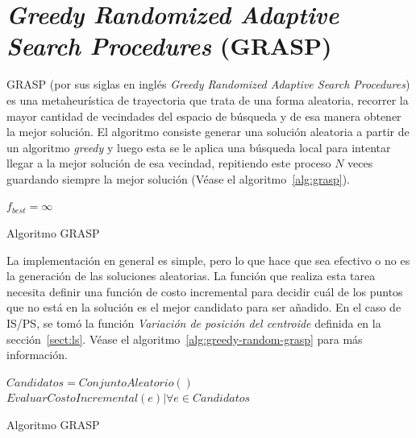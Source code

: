 \documentclass{ci5652}
\begin{document}
\section{\textit{\textbf{Greedy Randomized Adaptive Search Procedures}} (GRASP)}

GRASP (por sus siglas en inglés \textit{Greedy Randomized Adaptive Search Procedures}) es una metaheurística de trayectoria que trata de una forma aleatoria, recorrer la mayor cantidad de vecindades del espacio de búsqueda y de esa manera obtener la mejor solución. El algoritmo consiste generar una solución aleatoria a partir de un algoritmo \textit{greedy} y luego esta se le aplica una búsqueda local para intentar llegar a la mejor solución de esa vecindad, repitiendo este proceso $N$ veces guardando siempre la mejor solución (Véase el algoritmo~\ref{alg:grasp}). 

\begin{algorithm}
 \DontPrintSemicolon
 \vspace*{0.1cm}
 
 $f_{best} = \infty$\;
 \vspace*{0.1cm}
 \caption{Algoritmo GRASP}
 \label{alg:grasp}
\end{algorithm}
La implementación en general es simple, pero lo que hace que sea efectivo o no es la generación de las soluciones aleatorias. La función que realiza esta tarea necesita definir una función de costo incremental para decidir cuál de los puntos que no está en la solución es el mejor candidato para ser añadido. En el caso de IS/PS, se tomó la función \textit{Variación de posición del centroide} definida en la sección~\ref{sect:ls}. Véase el algoritmo~\ref{alg:greedy-random-grasp} para más información.


\begin{algorithm}
 \DontPrintSemicolon
 \vspace*{0.1cm}
 $Candidatos = ConjuntoAleatorio()$\;
 $EvaluarCostoIncremental(e)|\forall e\in Candidatos$\;
 \vspace*{0.1cm}
 \caption{Algoritmo GRASP}
 \label{alg:greedy-random-grasp}
\end{algorithm}
\end{document}
